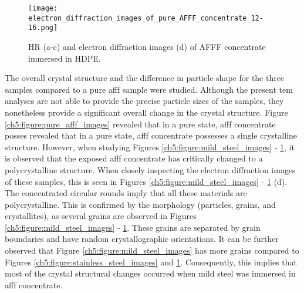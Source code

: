 \begin{figure}[H]
\centering

\texttt{[image: electron\_diffraction\_images\_of\_pure\_AFFF\_concentrate\_12-16.png]}

\caption{HR (a-c) and electron diffraction images (d) of AFFF concentrate immersed in HDPE.}
\label{ch5:figure:hdpe_images}
\end{figure}

The overall crystal structure and the difference in particle shape for the three samples compared to a pure \acrshort{afff} sample were studied. Although the present \acrshort{tem} analyses are not able to provide the precise particle sizes of the samples, they nonetheless provide a significant overall change in the crystal structure. Figure \ref{ch5:figure:pure_afff_images} revealed that in a pure state, \acrshort{afff} concentrate posses revealed that in a pure state, \acrshort{afff} concentrate possesses a single crystalline structure. However, when studying Figures \ref{ch5:figure:mild_steel_images} - \ref{ch5:figure:hdpe_images}, it is observed that the exposed \acrshort{afff} concentrate has critically changed to a polycrystalline structure. When closely inspecting the electron diffraction images of these samples, this is seen in Figures \ref{ch5:figure:mild_steel_images} - \ref{ch5:figure:hdpe_images} (d). The concentrated circular rounds imply that all these materials are polycrystalline. This is confirmed by the morphology (particles, grains, and crystallites), as several grains are observed in Figures \ref{ch5:figure:mild_steel_images} - \ref{ch5:figure:hdpe_images}. These grains are separated by grain boundaries and have random crystallographic orientations. It can be further observed that Figure \ref{ch5:figure:mild_steel_images} has more grains compared to Figures \ref{ch5:figure:stainless_steel_images} and \ref{ch5:figure:hdpe_images}. Consequently, this implies that most of the crystal structural changes occurred when mild steel was immersed in \acrshort{afff} concentrate.

